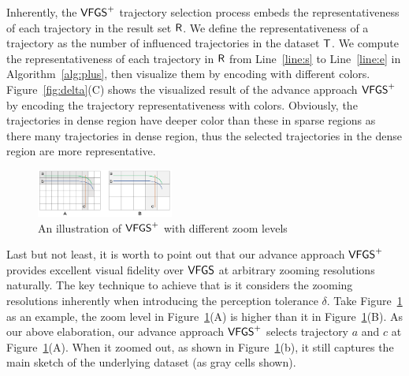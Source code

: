 Inherently, the $\mathsf{VFGS}^{+}$ trajectory selection process embeds the representativeness of each trajectory in the result set $\mathsf{R}$.
We define the representativeness of a trajectory as the number of influenced trajectories in the dataset $\mathsf{T}$.
We compute the representativeness of each trajectory in $\mathsf{R}$ from Line~\ref{line:s} to Line~\ref{line:e} in Algorithm~\ref{alg:plus}, then visualize them by encoding with different colors.
Figure~\ref{fig:delta}(C) shows the visualized result of the  advance approach $\mathsf{VFGS}^{+}$ by encoding the trajectory representativeness with colors.
Obviously, the trajectories in dense region have deeper color than these in sparse regions as there many trajectories in dense region, thus the selected trajectories in the dense region are more representative.

\begin{figure}[t]
	\centering
	\includegraphics[width=0.4\textwidth]{pictures/problemsolveing/one_to_many.pdf}
	\caption{An illustration of $\mathsf{VFGS}^{+}$ with different zoom levels}
	\label{fig:zoom}
    \vspace{-4mm}
\end{figure}

Last but not least, it is worth to point out that our advance approach $\mathsf{VFGS}^{+}$ provides excellent visual fidelity over $\mathsf{VFGS}$ at arbitrary zooming resolutions naturally.
The key technique to achieve that is it considers the zooming resolutions inherently when introducing the perception tolerance $\delta$.
Take Figure~\ref{fig:zoom} as an example, %
the zoom level in Figure~\ref{fig:zoom}(A) is higher than it in Figure~\ref{fig:zoom}(B).
As our above elaboration, our advance approach $\mathsf{VFGS}^{+}$ selects trajectory $a$ and $c$ at Figure~\ref{fig:zoom}(A).
When it zoomed out, as shown in Figure~\ref{fig:zoom}(b), it still captures the main sketch of the underlying dataset (as gray cells shown).







